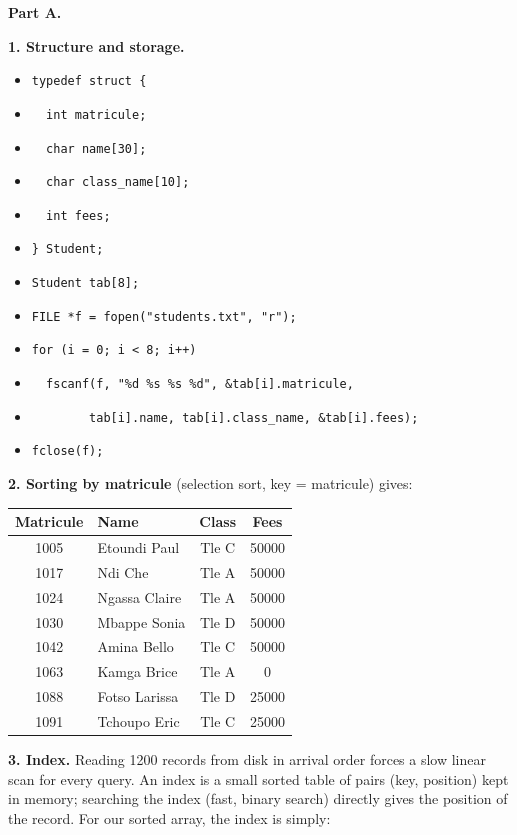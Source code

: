 \documentclass[11pt]{article}
\newcommand{\cle}[1]{{\popxbold\color{popdark}#1}}
\newcounter{popsec}
\newcounter{popsub}
\newcommand{\courssub}[1]{%
  \stepcounter{popsub}%
  \par\vspace{9pt}\noindent{\popxbold\fontsize{11.5}{13}\selectfont\color{popink}{\color{poporange}\thepopsec.\thepopsub}\hspace{6pt}#1}\par\nopagebreak\vspace{4pt}
}
\begin{document}
\courssub{Model answer}

\textbf{Part A.}

\textbf{1. Structure and storage.}

\begin{itemize}
\item[] \texttt{typedef struct \{}
\item[] \texttt{\ \ int matricule;}
\item[] \texttt{\ \ char name[30];}
\item[] \texttt{\ \ char class\_name[10];}
\item[] \texttt{\ \ int fees;}
\item[] \texttt{\} Student;}
\item[] \texttt{Student tab[8];}
\item[] \texttt{FILE *f = fopen("students.txt", "r");}
\item[] \texttt{for (i = 0; i < 8; i++)}
\item[] \texttt{\ \ fscanf(f, "\%d \%s \%s \%d", \&tab[i].matricule,}
\item[] \texttt{\ \ \ \ \ \ \ \ tab[i].name, tab[i].class\_name, \&tab[i].fees);}
\item[] \texttt{fclose(f);}
\end{itemize}

\textbf{2. Sorting by matricule} (selection sort, key = matricule) gives:

\begin{center}
\begin{tabular}{|c|l|c|c|}
\hline
\rowcolor{popblueL} \textbf{Matricule} & \textbf{Name} & \textbf{Class} & \textbf{Fees} \\
\hline
1005 & Etoundi Paul & Tle C & 50000 \\
\hline
1017 & Ndi Che & Tle A & 50000 \\
\hline
1024 & Ngassa Claire & Tle A & 50000 \\
\hline
1030 & Mbappe Sonia & Tle D & 50000 \\
\hline
1042 & Amina Bello & Tle C & 50000 \\
\hline
1063 & Kamga Brice & Tle A & 0 \\
\hline
1088 & Fotso Larissa & Tle D & 25000 \\
\hline
1091 & Tchoupo Eric & Tle C & 25000 \\
\hline
\end{tabular}
\end{center}

\textbf{3. Index.} Reading 1200 records from disk in arrival order forces a slow linear scan for every query. An \cle{index} is a small sorted table of pairs (key, position) kept in memory; searching the index (fast, binary search) directly gives the position of the record. For our sorted array, the index is simply:
\end{document}

